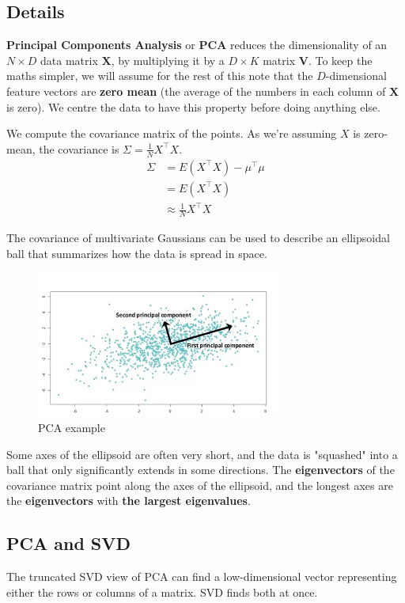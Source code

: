 \documentclass[a4paper, 12pt]{book} %
\begin{document}
\subsection{Details}
\textbf{Principal Components Analysis} or \textbf{PCA} reduces the dimensionality of an $N\times D$ data matrix $\mathbf{X}$, by multiplying it by a $D \times K$ matrix $\mathbf{V}$. To keep the maths simpler, we will assume for the rest of this note that the $D$-dimensional feature vectors are \textbf{zero mean} (the average of the numbers in each column of $\mathbf{X}$ is zero). We centre the data to have this property before doing anything else.

We compute the covariance matrix of the points. As we're assuming $X$ is zero-mean, the covariance is $\Sigma=\frac{1}{N}X^\top X$. 
\begin{equation}
\begin{split}
\Sigma & =E(X^\top X) - \mu^\top \mu \\
& = E(X^\top X) \\
& \approx \frac{1}{N}X^\top X
\end{split}
\end{equation}

The covariance of  multivariate Gaussians can be used to describe an ellipsoidal ball that summarizes how the data is spread in space.\\ 

\begin{figure}[htpb]
	\centering
	\includegraphics[width=8cm]{figures/pca.png}
	\caption{PCA example}
	\label{fig:boat1}
\end{figure}

Some axes of the ellipsoid are often very short, and the data is "squashed" into a ball that only significantly extends in some directions. The \textbf{eigenvectors} of the covariance matrix point along the axes of the ellipsoid, and the longest axes are the \textbf{eigenvectors} with \textbf{the largest eigenvalues}.

\subsection{PCA and SVD}
The truncated SVD view of PCA can find a low-dimensional vector representing either the rows or columns of a matrix. SVD finds both at once.
\end{document}
